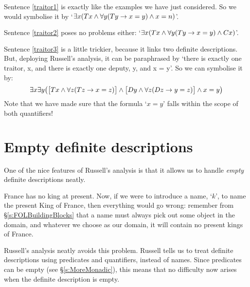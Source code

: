 Sentence \ref{traitor1} is exactly like the examples we have just considered. So we would symbolise it by `$\exists x (Tx \wedge \forall y(Ty \rightarrow x = y) \wedge x = n)$'. 

Sentence \ref{traitor2} poses no problems either: `$\exists x (Tx \wedge \forall y(Ty \rightarrow x = y) \wedge Cx)$'.

Sentence \ref{traitor3} is a little trickier, because it links two definite descriptions. But, deploying  Russell's analysis, it can be paraphrased by `there is exactly one traitor, x, and there is exactly one deputy, y, and x = y'. So we can symbolise it by: 
$$\exists x \exists y \bigl(\bigl[Tx \wedge \forall z(Tz \rightarrow x = z)\bigr] \wedge \bigl[Dy \wedge \forall z(Dz \rightarrow y = z)\bigr] \wedge x = y\bigr)$$
Note that we have made sure that the formula `$x = y$' falls within the scope of both quantifiers!

\section{Empty definite descriptions}
One of the nice features of Russell's analysis is that it allows us to handle \emph{empty} definite descriptions neatly. 

France has no king at present. Now, if we were to introduce a name, `$k$', to name the present King of France, then everything would go wrong: remember from \S\ref{s:FOLBuildingBlocks} that a name must always pick out  some object in the domain, and whatever we choose as our domain, it will contain no present kings of France. 

Russell's analysis neatly avoids this problem. Russell tells us to treat definite descriptions using predicates and quantifiers, instead of names. Since predicates can be empty (see \S\ref{s:MoreMonadic}), this means that no difficulty now arises when the definite description is empty. 

